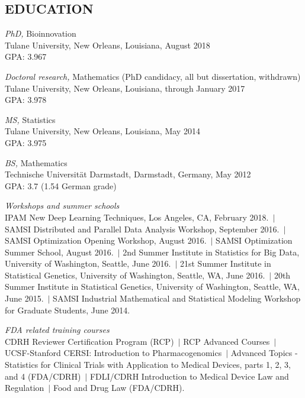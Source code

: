 \documentclass[overlapped, line, 10pt]{res} %
\begin{document}
\begin{resume}

\section{EDUCATION}

{\sl PhD,} Bioinnovation \\
Tulane University, New Orleans, Louisiana, August 2018\\
GPA: 3.967

{\sl Doctoral research,} Mathematics (PhD candidacy, all but dissertation, withdrawn)\\
Tulane University, New Orleans, Louisiana, through January 2017\\
GPA: 3.978

{\sl MS,} Statistics \\
Tulane University, New Orleans, Louisiana, May 2014\\
GPA: 3.975

{\sl BS,} Mathematics\\
Technische Universit\"{a}t Darmstadt, Darmstadt, Germany, May 2012\\
GPA: 3.7 (1.54 German grade)

{\sl Workshops and summer schools}\\
IPAM New Deep Learning Techniques, Los Angeles, CA, February 2018.~$|$
SAMSI Distributed and Parallel Data Analysis Workshop, September 2016.~$|$
SAMSI Optimization Opening Workshop, August 2016.~$|$
SAMSI Optimization Summer School, August 2016.~$|$
2nd Summer Institute in Statistics for Big Data, University of Washington, Seattle, June 2016.~$|$
21st Summer Institute in Statistical Genetics, University of Washington, Seattle, WA, June 2016.~$|$
20th Summer Institute in Statistical Genetics, University of Washington, Seattle, WA, June 2015.~$|$
SAMSI Industrial Mathematical and Statistical Modeling Workshop for Graduate Students, June 2014.

{\sl FDA related training courses}\\
CDRH Reviewer Certification Program (RCP)~$|$
RCP Advanced Courses~$|$
UCSF-Stanford CERSI: Introduction to Pharmacogenomics~$|$
Advanced Topics - Statistics for Clinical Trials with Application to Medical Devices, parts 1, 2, 3, and 4 (FDA/CDRH)~$|$
FDLI/CDRH Introduction to Medical Device Law and Regulation~$|$
Food and Drug Law (FDA/CDRH).


\end{resume}
\end{document}
